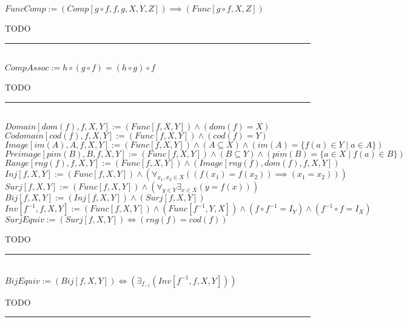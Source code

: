\documentclass{book}
\newcommand{\abr}{:=}
\newcommand{\st}{\mathbin{|}}
\begin{document}
$FuncComp \abr (Comp[g \circ f, f, g, X, Y, Z]) \implies (Func[g \circ f, X, Z])$
\begin{enumerate}
  \lit TODO
\end{enumerate} \vspace{.75mm} \hrule \vspace{.75mm} \ \\

$CompAssoc \abr h \circ (g \circ f) = (h \circ g) \circ f$
\begin{enumerate}
  \lit TODO
\end{enumerate} \vspace{.75mm} \hrule \vspace{.75mm} \ \\

$Domain[dom(f), f, X, Y] \abr (Func[f, X, Y]) \land (dom(f) = X)$ \\
$Codomain[cod(f), f, X, Y] \abr (Func[f, X, Y]) \land (cod(f) = Y)$ \\
$Image[im(A), A, f, X, Y] \abr (Func[f, X, Y]) \land (A \subseteq X) \land (im(A) = \{f(a) \in Y \st a \in A\})$ \\
$Preimage[pim(B), B, f, X, Y] \abr (Func[f, X, Y]) \land (B \subseteq Y) \land (pim(B) = \{a \in X \st f(a) \in B\})$ \\
$Range[rng(f), f, X, Y] \abr (Func[f, X, Y]) \land (Image[rng(f), dom(f), f, X, Y])$ \\

$Inj[f, X, Y] \abr (Func[f, X, Y]) \land (\forall_{x_1, x_2 \in X}((f(x_1) = f(x_2)) \implies (x_1 = x_2)))$ \\%
$Surj[f, X, Y] \abr (Func[f, X, Y]) \land (\forall_{y \in Y} \exists_{x \in X}(y = f(x)))$ \\%
$Bij[f, X, Y] \abr (Inj[f, X, Y]) \land (Surj[f, X, Y])$ \\%
$Inv[f^{-1}, f, X, Y] \abr (Func[f, X, Y]) \land (Func[f^{-1}, Y, X]) \land (f \circ f^{-1} = I_Y) \land (f^{-1} \circ f = I_X)$ \\

$SurjEquiv \abr (Surj[f, X, Y]) \iff (rng(f) = cod(f))$ \\
\begin{enumerate}
  \lit TODO
\end{enumerate} \vspace{.75mm} \hrule \vspace{.75mm} \ \\

$BijEquiv \abr (Bij[f, X, Y]) \iff (\exists_{f_{-1}}(Inv[f^{-1}, f, X, Y]))$ \\
\begin{enumerate}
  \lit TODO
\end{enumerate} \vspace{.75mm} \hrule \vspace{.75mm} \ \\
\end{document}
